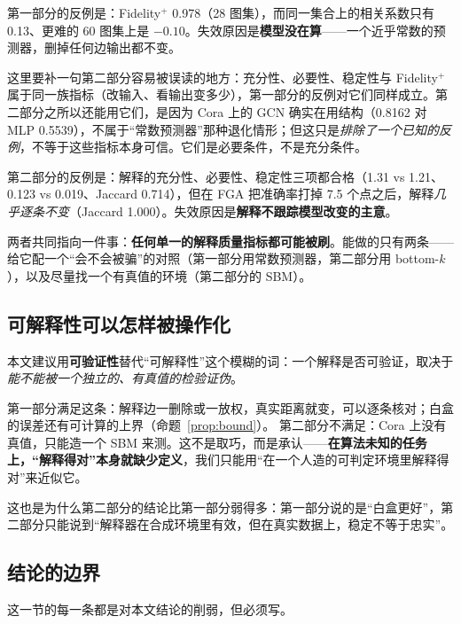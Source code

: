第一部分的反例是：Fidelity$^+$ 0.978（28 图集），而同一集合上的相关系数只有 0.13、更难的 60 图集上是 $-0.10$。失效原因是\textbf{模型没在算}——一个近乎常数的预测器，删掉任何边输出都不变。

这里要补一句第二部分容易被误读的地方：充分性、必要性、稳定性与 Fidelity$^+$ 属于同一族指标（改输入、看输出变多少），第一部分的反例对它们同样成立。第二部分之所以还能用它们，是因为 Cora 上的 GCN 确实在用结构（0.8162 对 MLP 0.5539），不属于“常数预测器”那种退化情形；但这只是\emph{排除了一个已知的反例}，不等于这些指标本身可信。它们是必要条件，不是充分条件。

第二部分的反例是：解释的充分性、必要性、稳定性三项都合格（1.31 vs 1.21、0.123 vs 0.019、Jaccard 0.714），但在 FGA 把准确率打掉 7.5 个点之后，解释\emph{几乎逐条不变}（Jaccard 1.000）。失效原因是\textbf{解释不跟踪模型改变的主意}。

两者共同指向一件事：\textbf{任何单一的解释质量指标都可能被刷}。能做的只有两条——给它配一个“会不会被骗”的对照（第一部分用常数预测器，第二部分用 bottom-$k$），以及尽量找一个有真值的环境（第二部分的 SBM）。

\subsection{可解释性可以怎样被操作化}

本文建议用\textbf{可验证性}替代“可解释性”这个模糊的词：一个解释是否可验证，取决于\emph{能不能被一个独立的、有真值的检验证伪}。

第一部分满足这条：解释边一删除或一放权，真实距离就变，可以逐条核对；白盒的误差还有可计算的上界（命题~\ref{prop:bound}）。
第二部分不满足：Cora 上没有真值，只能造一个 SBM 来测。这不是取巧，而是承认——\textbf{在算法未知的任务上，“解释得对”本身就缺少定义}，我们只能用“在一个人造的可判定环境里解释得对”来近似它。

这也是为什么第二部分的结论比第一部分弱得多：第一部分说的是“白盒更好”，第二部分只能说到“解释器在合成环境里有效，但在真实数据上，稳定不等于忠实”。

\subsection{结论的边界}\label{sec:limits}

这一节的每一条都是对本文结论的削弱，但必须写。

